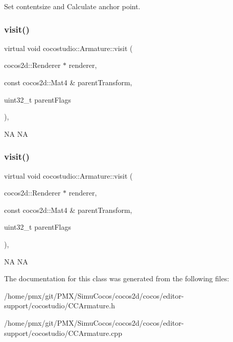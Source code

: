 Set contentsize and Calculate anchor point. \mbox{\label{classcocostudio_1_1Armature_a1937eec5f06a4d889d2a46612b027714}} 
\subsubsection{\texorpdfstring{visit()}{visit()}\hspace{0.1cm}{\footnotesize\ttfamily [1/2]}}
{\footnotesize\ttfamily virtual void cocostudio\+::\+Armature\+::visit (\begin{DoxyParamCaption}\item[{cocos2d\+::\+Renderer $\ast$}]{renderer,  }\item[{const cocos2d\+::\+Mat4 \&}]{parent\+Transform,  }\item[{uint32\+\_\+t}]{parent\+Flags }\end{DoxyParamCaption})\hspace{0.3cm}{\ttfamily [override]}, {\ttfamily [virtual]}}

NA  NA \mbox{\label{classcocostudio_1_1Armature_a1937eec5f06a4d889d2a46612b027714}} 
\subsubsection{\texorpdfstring{visit()}{visit()}\hspace{0.1cm}{\footnotesize\ttfamily [2/2]}}
{\footnotesize\ttfamily virtual void cocostudio\+::\+Armature\+::visit (\begin{DoxyParamCaption}\item[{cocos2d\+::\+Renderer $\ast$}]{renderer,  }\item[{const cocos2d\+::\+Mat4 \&}]{parent\+Transform,  }\item[{uint32\+\_\+t}]{parent\+Flags }\end{DoxyParamCaption})\hspace{0.3cm}{\ttfamily [override]}, {\ttfamily [virtual]}}

NA  NA 

The documentation for this class was generated from the following files\+:\begin{DoxyCompactItemize}
\item 
/home/pmx/git/\+P\+M\+X/\+Simu\+Cocos/cocos2d/cocos/editor-\/support/cocostudio/C\+C\+Armature.\+h\item 
/home/pmx/git/\+P\+M\+X/\+Simu\+Cocos/cocos2d/cocos/editor-\/support/cocostudio/C\+C\+Armature.\+cpp\end{DoxyCompactItemize}
